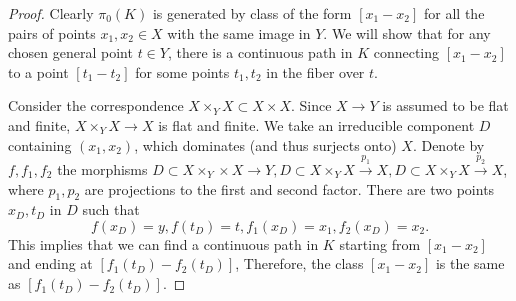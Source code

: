 \documentclass{amsart}
\theoremstyle{definition}
\theoremstyle{remark}
\begin{document}
\begin{proof}
Clearly $\pi_0(K)$ is generated by class of the form $[x_1-x_2]$ for all the pairs of points $x_1, x_2 \in X$ with the same image in $Y$.
We will show that for any chosen general point $t \in Y$, there is a continuous path in $K$ connecting $[x_1-x_2]$ to a point $[t_1-t_2]$ for some points $t_1, t_2$ in the fiber over $t$. 

Consider the correspondence $X \times_Y X\subset X \times X$.
Since $X \to Y$ is assumed to be flat and finite, $X \times_Y X \to X$ is flat and finite.
We take an irreducible component $D$ containing $(x_1, x_2)$, which dominates (and thus surjects onto) $X$. 
Denote by $f, f_1, f_2$ the morphisms $D \subset X \times_Y \times X \to Y, D \subset X \times_Y X \xrightarrow{p_1} X, D \subset X \times_Y X \xrightarrow{p_2} X$, where $p_1, p_2$ are projections to the first and second factor.
 There are two points $x_D, t_D$ in $D$ such that \[
 f(x_D)=y, f(t_D)=t, f_1(x_D)=x_1, f_2(x_D)=x_2.
 \] 
This implies that we can find a continuous path in $K$ starting from $[x_1- x_2]$ and ending at $[f_1(t_D)-f_2(t_D)]$, Therefore, the class $[x_1-x_2]$ is the same  as $[f_1(t_D)-f_2(t_D)]$.
\end{proof}
\end{document}
